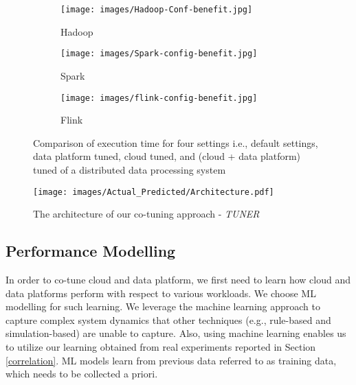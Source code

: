\documentclass[3p]{elsarticle}
\begin{document}
\begin{figure*}
\centering
\begin{subfigure}{.30\textwidth}
  \centering
  \texttt{[image: images/Hadoop-Conf-benefit.jpg]}
  \caption{Hadoop}
  \label{hadoop-config-benefit}
\end{subfigure}%
\begin{subfigure}{.30\textwidth}
  \centering
  \texttt{[image: images/Spark-config-benefit.jpg]}
  \caption{Spark}
  \label{spark-config-benefit}
\end{subfigure}
\begin{subfigure}{.30\textwidth}
  \centering
  \texttt{[image: images/flink-config-benefit.jpg]}
  \caption{Flink}
  \label{flink-config-benefit}
\end{subfigure}
\caption{Comparison of execution time for four settings i.e., default settings, data platform tuned, cloud tuned, and (cloud + data platform) tuned of a distributed data processing system}
\label{tuning_benefit}
\end{figure*}

\begin{figure}[t]
\centering
  \texttt{[image: images/Actual\_Predicted/Architecture.pdf]}
\caption{The architecture of our co-tuning approach - \textit{TUNER}}
\label{tuner-architecture}
\end{figure}


\subsection{Performance Modelling} In order to co-tune cloud and data platform, we first need to learn how cloud and data platforms perform with respect to various workloads. We choose ML modelling for such learning. We leverage the machine learning approach to capture complex system dynamics that other techniques (e.g., rule-based and simulation-based) are unable to capture. Also, using machine learning enables us to utilize our learning obtained from real experiments reported in Section \ref{correlation}. ML models learn from previous data referred to as training data, which needs to be collected a priori. 
\end{document}
